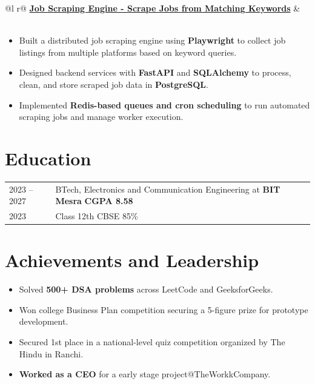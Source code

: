 \documentclass[a4paper,12pt]{article}
\begin{document}
\begin{tabularx}{\linewidth}{@{}l r@{}}
\href{https://github.com/rudrakshSoni-dev/job-scraper-engine}{\textbf{Job Scraping Engine - Scrape Jobs from Matching Keywords}} & \\
 \\
\end{tabularx}

\begin{itemize}
\item Built a distributed job scraping engine using \textbf{Playwright} to collect job listings from multiple platforms based on keyword queries.
\item Designed backend services with \textbf{FastAPI} and \textbf{SQLAlchemy} to process, clean, and store scraped job data in \textbf{PostgreSQL}.
\item Implemented \textbf{Redis-based queues and cron scheduling} to run automated scraping jobs and manage worker execution.
\end{itemize}

\vspace{2pt}


\section{Education}

\begin{tabularx}{\linewidth}{@{}l@{\hspace{1.2cm}}X@{}}

2023 -- 2027 & BTech, Electronics and Communication Engineering at \textbf{BIT Mesra} \hfill \textbf{CGPA 8.58}\\

2023 & Class 12th CBSE \hfill 85\% \\

\end{tabularx}


\section{Achievements and Leadership}

\begin{itemize}
\item Solved \textbf{500+ DSA problems} across LeetCode and GeeksforGeeks.
\item Won college Business Plan competition securing a 5-figure prize for prototype development.
\item Secured 1st place in a national-level quiz competition organized by The Hindu in Ranchi.
\item \textbf{Worked as a CEO} for a early stage project@TheWorkkCompany.
\end{itemize}
\end{document}
